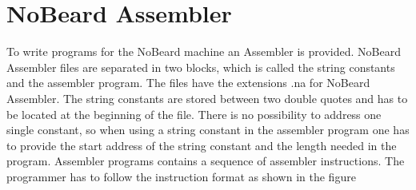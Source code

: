 \section{NoBeard Assembler}
To write programs for the NoBeard machine an Assembler is provided. NoBeard Assembler files are separated in two blocks, which is called the string constants and the assembler program. The files have the extensions .na for NoBeard Assembler. The string constants are stored between two double quotes and has to be located at the beginning of the file. There is no possibility to address one single constant, so when using a string constant in the assembler program one has to provide the start address of the string constant and the length needed in the program.  Assembler programs contains a sequence of assembler instructions. The programmer has to follow the instruction format as shown in the figure